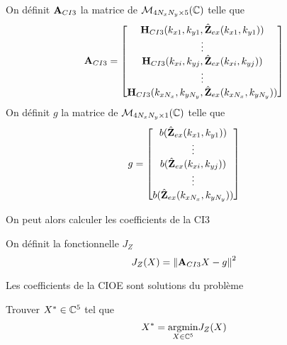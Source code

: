     \begin{defn}
      On définit \(\mathbf{A}_{CI3}\) la matrice de \(\mathcal{M}_{4N_xN_y\times5}(\mathbb C)\) telle que
      \begin{equation*}
        \mathbf{A}_{CI3} = 
        \begin{bmatrix}
          \mathbf{H}_{CI3}(k_{x1},k_{y1},\hat{\mathbf{Z}}_{ex}(k_{x1},k_{y1}))
          \\
          \vdots
          \\
          \mathbf{H}_{CI3}(k_{xi},k_{yj},\hat{\mathbf{Z}}_{ex}(k_{xi},k_{yj}))
          \\
          \vdots
          \\
          \mathbf{H}_{CI3}(k_{xN_x},k_{yN_y},\hat{\mathbf{Z}}_{ex}(k_{xN_x},k_{yN_y}))
        \end{bmatrix}
      \end{equation*}
      On définit \(g\) la matrice de \(\mathcal{M}_{4N_xN_y\times1}(\mathbb C)\) telle que
      \begin{equation*}
        g = 
        \begin{bmatrix}
          b(\hat{\mathbf{Z}}_{ex}(k_{x1},k_{y1}))
          \\
          \vdots
          \\
          b(\hat{\mathbf{Z}}_{ex}(k_{xi},k_{yj}))
          \\
          \vdots
          \\
          b(\hat{\mathbf{Z}}_{ex}(k_{xN_x},k_{yN_y}))
        \end{bmatrix}
      \end{equation*}
    \end{defn}

    On peut alors calculer les coefficients de la CI3
    \begin{defn}
      On définit la fonctionnelle \(J_Z\)
      \begin{equation*}
        J_Z(X) = \left\lVert{\mathbf{A}}_{CI3}X - {g}\right\rVert^2
      \end{equation*}
    \end{defn}

    \begin{thm}
      Les coefficients de la CIOE sont solutions du problème

      Trouver \(X^* \in \mathbb C^5\) tel que
      \begin{equation*}
        X^* = {\underset{X\in \mathbb C^5}{\operatorname{argmin}}}  J_Z(X)
      \end{equation*}
    \end{thm}

